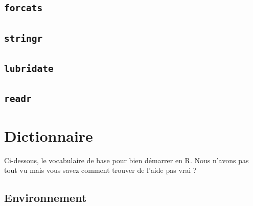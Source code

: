 \documentclass[
  letterpaper,
  DIV=11,
  numbers=noendperiod]{scrreprt}
\begin{document}
\hypertarget{forcats}{%
\section{\texorpdfstring{\texttt{forcats}}{forcats}}\label{forcats}}

\hypertarget{stringr}{%
\section{\texorpdfstring{\texttt{stringr}}{stringr}}\label{stringr}}

\hypertarget{lubridate}{%
\section{\texorpdfstring{\texttt{lubridate}}{lubridate}}\label{lubridate}}

\hypertarget{readr-1}{%
\section{\texorpdfstring{\texttt{readr}}{readr}}\label{readr-1}}


\hypertarget{dictionnaire}{%
\chapter{Dictionnaire}\label{dictionnaire}}

Ci-dessous, le vocabulaire de base pour bien démarrer en R. Nous n'avons
pas tout vu mais vous savez comment trouver de l'aide pas vrai ?

\hypertarget{environnement}{%
\section{Environnement}\label{environnement}}
\end{document}
